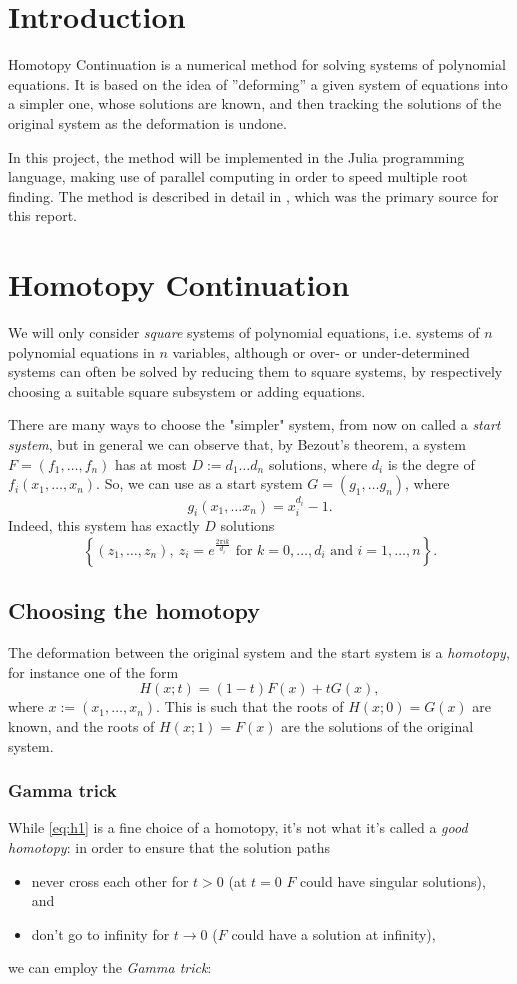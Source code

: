 \documentclass[a4paper]{article}
\theoremstyle{definition}
\theoremstyle{definition}
\theoremstyle{remark}
\theoremstyle{definition}
\begin{document}
\tableofcontents
\newpage

\section{Introduction}
Homotopy Continuation is a numerical method for solving systems of polynomial equations.
It is based on the idea of ”deforming” a given system of equations into a simpler one, whose
solutions are known, and then tracking the solutions of the original system as the deformation
is undone.

In this project, the method will be implemented in the Julia programming language, making use
of parallel computing in order to speed multiple root finding. The method is described in detail
in \cite{BertiniBook}, which was the primary source for this report.

\section{Homotopy Continuation}
We will only consider \textit{square} systems of polynomial equations, i.e. systems of $n$ polynomial equations in $n$ variables, although or over- or under-determined systems can
often be solved by reducing them to square systems, by respectively choosing a suitable square subsystem or adding equations.

There are many ways to choose the "simpler" system, from now on called a \textit{start system}, but in general we can observe that, by Bezout's theorem, a system
$F=(f_1,\ldots,f_n)$ has at most $D:=d_1\ldots d_n$ solutions, where $d_i$ is the degre of $f_i(x_1,\ldots,x_n)$. So, we can use as a start system $G=(g_1,\ldots g_n)$, where
$$ g_i(x_1,\ldots x_n)=x_i^{d_i}-1 .$$
Indeed, this system has exactly $D$ solutions
$$ \left\{(z_1,\ldots,z_n),~z_i=e^{\frac{2\pi i k}{d_i}}\text{ for }k=0,\ldots,d_i\text{ and }i=1,\ldots,n\right\} .$$
\subsection{Choosing the homotopy}
The deformation between the original system and the start system is a \textit{homotopy}, for instance one of the form
\begin{equation}\label{eq:h1} H(x;t)=(1-t)F(x)+tG(x) ,\end{equation}
where $x:=(x_1,\ldots,x_n).$ This is such that the roots of $H(x;0)=G(x)$ are known, and the roots of $H(x;1)=F(x)$ are the solutions of the original system.
\subsubsection{Gamma trick}
While \eqref{eq:h1} is a fine choice of a homotopy, it's not what it's called a \textit{good homotopy}: in order to ensure that the solution paths
\begin{itemize}
    \item never cross each other for $t>0$ (at $t=0$ $F$ could have singular solutions), and
    \item don't go to infinity for $t\to 0$ ($F$ could have a solution at infinity),
\end{itemize}
we can employ the \textit{Gamma trick}:
\end{document}
